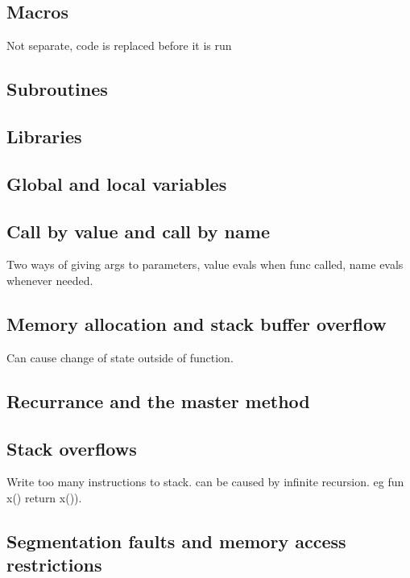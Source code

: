 
\subsection{Macros}

Not separate, code is replaced before it is run


\subsection{Subroutines}

\subsection{Libraries}

\subsection{Global and local variables}

\subsection{Call by value and call by name}

Two ways of giving args to parameters, value evals when func called, name evals whenever needed.

\subsection{Memory allocation and stack buffer overflow}

Can cause change of state outside of function.

\subsection{Recurrance and the master method}

\subsection{Stack overflows}

Write too many instructions to stack. can be caused by infinite recursion. eg fun x() return x()).

\subsection{Segmentation faults and memory access restrictions}

